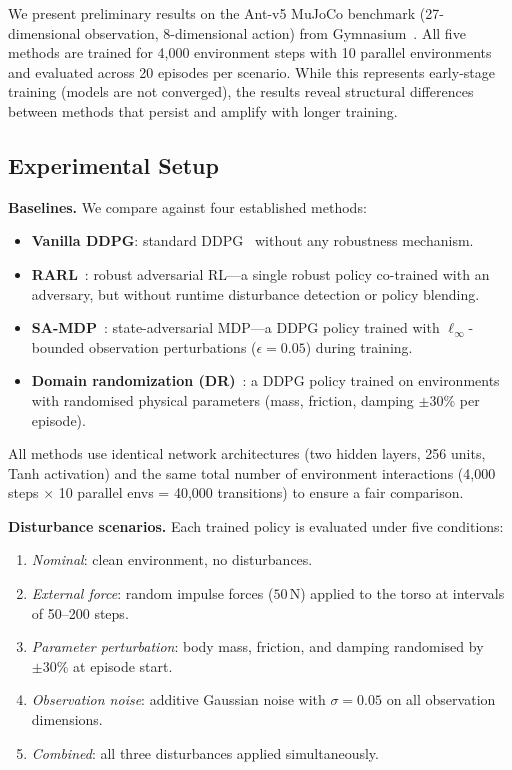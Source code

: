 \documentclass[conference]{IEEEtran}
\begin{document}
We present preliminary results on the Ant-v5 MuJoCo benchmark
(27-dimensional observation, 8-dimensional action) from
Gymnasium~\cite{towers2024gymnasium}.  All five methods are trained for
4{,}000 environment steps with 10 parallel environments and evaluated
across 20 episodes per scenario.  While this represents early-stage
training (models are not converged), the results reveal structural
differences between methods that persist and amplify with longer training.

\subsection{Experimental Setup}\label{sec:setup}

\textbf{Baselines.} We compare against four established methods:
\begin{itemize}
\item \textbf{Vanilla DDPG}: standard DDPG~\cite{lillicrap2016continuous}
  without any robustness mechanism.
\item \textbf{RARL}~\cite{pinto2017robust}: robust adversarial RL---a
  single robust policy co-trained with an adversary, but without
  runtime disturbance detection or policy blending.
\item \textbf{SA-MDP}~\cite{zhang2020robust}: state-adversarial MDP---a
  DDPG policy trained with $\ell_\infty$-bounded observation perturbations
  ($\epsilon = 0.05$) during training.
\item \textbf{Domain randomization (DR)}~\cite{tobin2017domain}: a DDPG
  policy trained on environments with randomised physical parameters
  (mass, friction, damping $\pm 30\%$ per episode).
\end{itemize}

All methods use identical network architectures (two hidden layers, 256
units, Tanh activation) and the same total number of environment
interactions (4{,}000 steps $\times$ 10 parallel envs = 40{,}000
transitions) to ensure a fair comparison.

\textbf{Disturbance scenarios.}  Each trained policy is evaluated under
five conditions:
\begin{enumerate}
\item \emph{Nominal}: clean environment, no disturbances.
\item \emph{External force}: random impulse forces ($50\,$N) applied to
  the torso at intervals of 50--200 steps.
\item \emph{Parameter perturbation}: body mass, friction, and damping
  randomised by $\pm 30\%$ at episode start.
\item \emph{Observation noise}: additive Gaussian noise with
  $\sigma = 0.05$ on all observation dimensions.
\item \emph{Combined}: all three disturbances applied simultaneously.
\end{enumerate}
\end{document}
